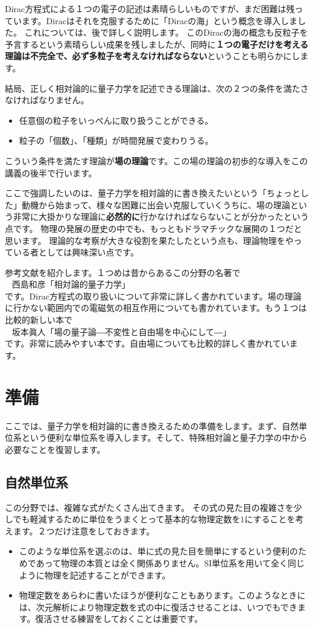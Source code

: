 \documentclass[report,paper=a4, fontsize=12pt, line_length=16cm, number_of_lines=33,dvipdfmx]{jlreq}
\newenvironment{mycite}{\\ \qquad \textbullet\ }{\\}
\numberwithin{equation}{chapter}
\newcommand{\strong}[1]{{\sffamily \bfseries #1}}
\begin{document}
Dirac方程式による１つの電子の記述は素晴らしいものですが、まだ困難は残っています。Diracはそれを克服するために「Diracの海」という概念を導入しました。
これについては、後で詳しく説明します。
このDiracの海の概念も反粒子を予言するという素晴らしい成果を残しましたが、同時に\strong{１つの電子だけを考える理論は不完全で、必ず多粒子を考えなければならない}ということも明らかにします。

結局、正しく相対論的に量子力学を記述できる理論は、次の２つの条件を満たさなければなりません。
\begin{itemize}
  \item 任意個の粒子をいっぺんに取り扱うことができる。
  \item 粒子の「個数」、「種類」が時間発展で変わりうる。
\end{itemize}
こういう条件を満たす理論が\strong{場の理論}です。この場の理論の初歩的な導入をこの講義の後半で行います。

ここで強調したいのは、量子力学を相対論的に書き換えたいという「ちょっとした」動機から始まって、様々な困難に出会い克服していくうちに、場の理論という非常に大掛かりな理論に\strong{必然的に}行かなければならないことが分かったという点です。
物理の発展の歴史の中でも、もっともドラマチックな展開の１つだと思います。
理論的な考察が大きな役割を果たしたという点も、理論物理をやっている者としては興味深い点です。

参考文献を紹介します。１つめは昔からあるこの分野の名著で
\begin{mycite}
  西島和彦「相対論的量子力学」
\end{mycite}
です。Dirac方程式の取り扱いについて非常に詳しく書かれています。場の理論に行かない範囲内での電磁気の相互作用についても書かれています。もう１つは比較的新しい本で
\begin{mycite}
  坂本眞人「場の量子論―不変性と自由場を中心にして―」
\end{mycite}
です。非常に読みやすい本です。自由場についても比較的詳しく書かれています。

\chapter{準備}
ここでは、量子力学を相対論的に書き換えるための準備をします。まず、自然単位系という便利な単位系を導入します。そして、特殊相対論と量子力学の中から必要なことを復習します。

\section{自然単位系}
この分野では、複雑な式がたくさん出てきます。
その式の見た目の複雑さを少しでも軽減するために単位をうまくとって基本的な物理定数を$1$にすることを考えます。２つだけ注意をしておきます。
\begin{itemize}
  \item このような単位系を選ぶのは、単に式の見た目を簡単にするという便利のためであって物理の本質とは全く関係ありません。SI単位系を用いて全く同じように物理を記述することができます。
  \item 物理定数をあらわに書いたほうが便利なこともあります。このようなときには、次元解析により物理定数を式の中に復活させることは、いつでもできます。復活させる練習をしておくことは重要です。
\end{itemize}
\end{document}

